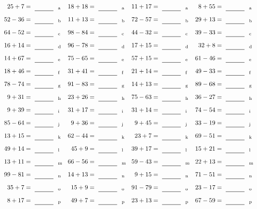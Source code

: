 \documentclass
[
  draft    = true,
  fontsize = 11pt,
  parskip  = half-
]
{scrartcl}
\begin{document}
\clearpage
\begin{align*}
    \pline{25+7}&=\rline{a}
  & \pline{18+18}&=\rline{a}
  & \pline{11+17}&=\rline{a}
  & \pline{8+55}&=\rline{a} \\[1ex]
    \pline{52-36}&=\rline{b}
  & \pline{11+13}&=\rline{b}
  & \pline{72-57}&=\rline{b}
  & \pline{29+13}&=\rline{b} \\[1ex]
    \pline{64-52}&=\rline{c}
  & \pline{98-84}&=\rline{c}
  & \pline{44-32}&=\rline{c}
  & \pline{39-33}&=\rline{c} \\[1ex]
    \pline{16+14}&=\rline{d}
  & \pline{96-78}&=\rline{d}
  & \pline{17+15}&=\rline{d}
  & \pline{32+8}&=\rline{d} \\[1ex]
    \pline{14+67}&=\rline{e}
  & \pline{75-65}&=\rline{e}
  & \pline{57+15}&=\rline{e}
  & \pline{61-46}&=\rline{e} \\[1ex]
    \pline{18+46}&=\rline{f}
  & \pline{31+41}&=\rline{f}
  & \pline{21+14}&=\rline{f}
  & \pline{49-33}&=\rline{f} \\[1ex]
    \pline{78-74}&=\rline{g}
  & \pline{91-83}&=\rline{g}
  & \pline{14+13}&=\rline{g}
  & \pline{89-68}&=\rline{g} \\[1ex]
    \pline{9+31}&=\rline{h}
  & \pline{23+26}&=\rline{h}
  & \pline{75-63}&=\rline{h}
  & \pline{36-27}&=\rline{h} \\[1ex]
    \pline{9+39}&=\rline{i}
  & \pline{31+17}&=\rline{i}
  & \pline{31+14}&=\rline{i}
  & \pline{74-54}&=\rline{i} \\[1ex]
    \pline{85-64}&=\rline{j}
  & \pline{9+36}&=\rline{j}
  & \pline{9+45}&=\rline{j}
  & \pline{33-19}&=\rline{j} \\[1ex]
    \pline{13+15}&=\rline{k}
  & \pline{62-44}&=\rline{k}
  & \pline{23+7}&=\rline{k}
  & \pline{69-51}&=\rline{k} \\[1ex]
    \pline{49+14}&=\rline{l}
  & \pline{45+9}&=\rline{l}
  & \pline{39+17}&=\rline{l}
  & \pline{15+21}&=\rline{l} \\[1ex]
    \pline{13+11}&=\rline{m}
  & \pline{66-56}&=\rline{m}
  & \pline{59-43}&=\rline{m}
  & \pline{22+13}&=\rline{m} \\[1ex]
    \pline{99-81}&=\rline{n}
  & \pline{14+13}&=\rline{n}
  & \pline{9+15}&=\rline{n}
  & \pline{71-51}&=\rline{n} \\[1ex]
    \pline{35+7}&=\rline{o}
  & \pline{15+9}&=\rline{o}
  & \pline{91-79}&=\rline{o}
  & \pline{23-17}&=\rline{o} \\[1ex]
    \pline{8+17}&=\rline{p}
  & \pline{49+7}&=\rline{p}
  & \pline{23+13}&=\rline{p}
  & \pline{67-59}&=\rline{p}
\end{align*}
\end{document}
